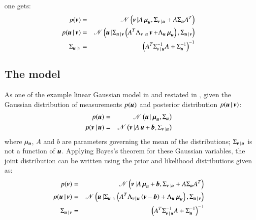 one gets:
\begin{eqnarray}
	p(\mybold{v}) =&& \distr \left( \mybold{v}| A\mybold{\mu}_{\mybold{u}},\Sigma_{\mybold{v}|\mybold{u}} +A\Sigma_{\mybold{u}}  A^T \right) \nonumber\\
	p(\mybold{u}|\mybold{v}) =&& \distr \left( \mybold{u}| \Sigma_{\mybold{u}|\mybold{v}} \left(	A^T\Lambda_{\mybold{v}|\mybold{u}} \mybold{v} +\Lambda_{\mybold{u}}\mybold{\mu}_{\mybold{u}} \right),\Sigma_{\mybold{u}|\mybold{v}} \right) \nonumber\\
	\Sigma_{\mybold{u}|\mybold{v}} =&& \left(A^T\Sigma_{\mybold{v}|\mybold{u}}^{-1}A+\Sigma_{\mybold{u}}^{-1}\right)^{-1}
\label{eq:LG22}	
\end{eqnarray}

\subsection{ The model}
As one of the example linear Gaussian model in \cite{roweis1999unifying} and restated in \cite{bishop2006pattern}, given the Gaussian distribution of measurements $p(\operatorname{\boldsymbol{u}}) $ and posterior distribution $ p(\operatorname{\boldsymbol{u}}|\operatorname{\boldsymbol{v}}) $:
\begin{eqnarray}
	p(\mybold{u}) =&& \distr \left( \mybold{u}| \mybold{\mu}_{\mybold{u}},\Sigma_{\mybold{u}} \right) \nonumber\\
	p(\mybold{v}|\mybold{u}) =&& \distr \left( \mybold{v}| A\mybold{u}+\mybold{b},\Sigma_{\mybold{v}|\mybold{u}} \right)
\label{eq:bishop_linear_gaussian_1}	
\end{eqnarray}
where $ \mu_{\operatorname{\boldsymbol{u}}} $, $ A $ and $ b $ are parameters governing the mean of the distributions; $ \Sigma_{\operatorname{\boldsymbol{v}}|\operatorname{\boldsymbol{u}}} $ is not a function of $ \operatorname{\boldsymbol{u}} $. Applying Bayes's theorem for these Gaussian variables, the joint distribution can be written using the prior and likelihood distributions given as:
\begin{eqnarray}
	p(\mybold{v}) =&& \distr \left( \mybold{v}| A\mybold{\mu}_{\mybold{u}} + \mybold{b},\Sigma_{\mybold{v}|\mybold{u}} +A\Sigma_{\mybold{u}}  A^T \right) \nonumber\\
	p(\mybold{u}|\mybold{v}) =&& \distr \left( \mybold{u}| \Sigma_{\mybold{u}|\mybold{v}} \left(	A^T\Lambda_{\mybold{v}|\mybold{u}} \left( \mybold{v} - \mybold{b} \right) +\Lambda_{\mybold{u}}\mybold{\mu}_{\mybold{u}} \right),\Sigma_{\mybold{u}|\mybold{v}} \right) \nonumber\\
	\Sigma_{\mybold{u}|\mybold{v}} =&& \left(A^T\Sigma_{\mybold{v}|\mybold{u}}^{-1}A+\Sigma_{\mybold{u}}^{-1}\right)^{-1}
\label{eq:bishop_linear_gaussian_2}	
\end{eqnarray}

